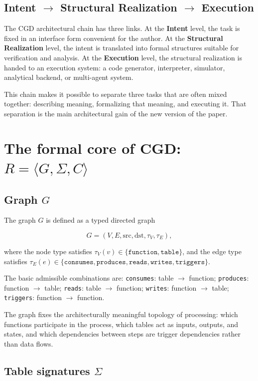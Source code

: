 \documentclass[12pt,a4paper]{article}
\begin{document}
\subsection{Intent $\to$ Structural Realization $\to$ Execution}

The CGD architectural chain has three links. At the \textbf{Intent} level, the task is fixed in an interface form convenient for the author. At the \textbf{Structural Realization} level, the intent is translated into formal structures suitable for verification and analysis. At the \textbf{Execution} level, the structural realization is handed to an execution system: a code generator, interpreter, simulator, analytical backend, or multi-agent system.

This chain makes it possible to separate three tasks that are often mixed together: describing meaning, formalizing that meaning, and executing it. That separation is the main architectural gain of the new version of the paper.

\section{The formal core of CGD: $R = \langle G, \Sigma, C \rangle$}

\subsection{Graph $G$}

The graph $G$ is defined as a typed directed graph


$$G = (V, E, \mathrm{src}, \mathrm{dst}, \tau_V, \tau_E),$$

where the node type satisfies $\tau_V(v) \in \{\texttt{function}, \texttt{table}\}$, and the edge type satisfies $\tau_E(e) \in \{\texttt{consumes}, \texttt{produces}, \texttt{reads}, \texttt{writes}, \texttt{triggers}\}$.

The basic admissible combinations are: \texttt{consumes}: table $\to$ function; \texttt{produces}: function $\to$ table; \texttt{reads}: table $\to$ function; \texttt{writes}: function $\to$ table; \texttt{triggers}: function $\to$ function.

The graph fixes the architecturally meaningful topology of processing: which functions participate in the process, which tables act as inputs, outputs, and states, and which dependencies between steps are trigger dependencies rather than data flows.

\subsection{Table signatures $\Sigma$}
\end{document}
